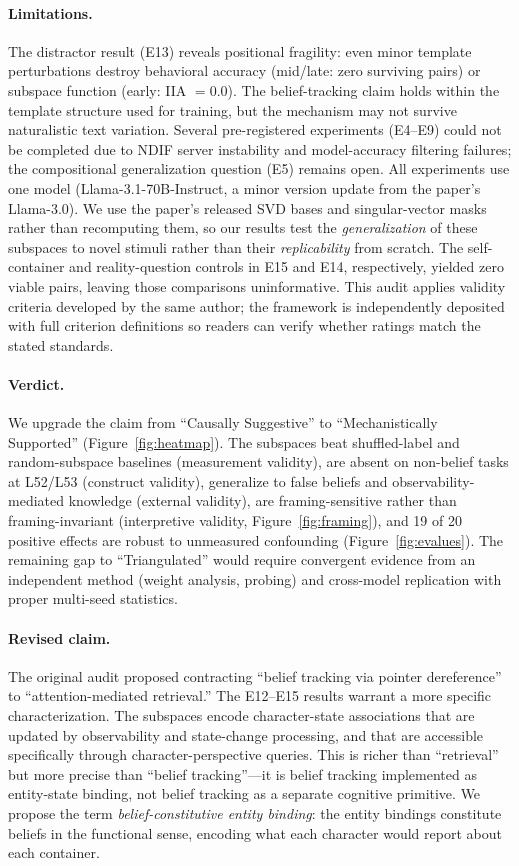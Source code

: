 \documentclass[11pt]{article}
\begin{document}
\paragraph{Limitations.}
The distractor result (E13) reveals positional fragility: even minor template perturbations destroy behavioral accuracy (mid/late: zero surviving pairs) or subspace function (early: IIA $= 0.0$). The belief-tracking claim holds within the template structure used for training, but the mechanism may not survive naturalistic text variation. Several pre-registered experiments (E4--E9) could not be completed due to NDIF server instability and model-accuracy filtering failures; the compositional generalization question (E5) remains open. All experiments use one model (Llama-3.1-70B-Instruct, a minor version update from the paper's Llama-3.0). We use the paper's released SVD bases and singular-vector masks rather than recomputing them, so our results test the \emph{generalization} of these subspaces to novel stimuli rather than their \emph{replicability} from scratch. The self-container and reality-question controls in E15 and E14, respectively, yielded zero viable pairs, leaving those comparisons uninformative. This audit applies validity criteria developed by the same author; the framework is independently deposited with full criterion definitions so readers can verify whether ratings match the stated standards.

\paragraph{Verdict.}
We upgrade the claim from ``Causally Suggestive'' to ``Mechanistically Supported'' (Figure~\ref{fig:heatmap}). The subspaces beat shuffled-label and random-subspace baselines (measurement validity), are absent on non-belief tasks at L52/L53 (construct validity), generalize to false beliefs and observability-mediated knowledge (external validity), are framing-sensitive rather than framing-invariant (interpretive validity, Figure~\ref{fig:framing}), and 19 of 20 positive effects are robust to unmeasured confounding (Figure~\ref{fig:evalues}). The remaining gap to ``Triangulated'' would require convergent evidence from an independent method (weight analysis, probing) and cross-model replication with proper multi-seed statistics.

\paragraph{Revised claim.}
The original audit proposed contracting ``belief tracking via pointer dereference'' to ``attention-mediated retrieval.'' The E12--E15 results warrant a more specific characterization. The subspaces encode character-state associations that are updated by observability and state-change processing, and that are accessible specifically through character-perspective queries. This is richer than ``retrieval'' but more precise than ``belief tracking''---it is belief tracking implemented as entity-state binding, not belief tracking as a separate cognitive primitive. We propose the term \emph{belief-constitutive entity binding}: the entity bindings constitute beliefs in the functional sense, encoding what each character would report about each container.
\end{document}
